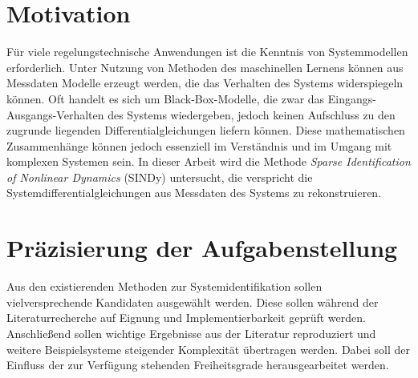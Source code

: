 \section{Motivation}
Für viele regelungstechnische Anwendungen ist die Kenntnis von Systemmodellen erforderlich. Unter Nutzung von Methoden des maschinellen Lernens können aus Messdaten Modelle erzeugt werden, die das Verhalten des Systems widerspiegeln können. Oft handelt es sich um Black-Box-Modelle, die zwar das Eingangs-Ausgangs-Verhalten des Systems wiedergeben, jedoch keinen Aufschluss zu den zugrunde liegenden Differentialgleichungen liefern können. Diese mathematischen Zusammenhänge können jedoch essenziell im Verständnis und im Umgang mit komplexen Systemen sein. In dieser Arbeit wird die Methode \textit{Sparse Identification of Nonlinear Dynamics} (SINDy) untersucht, die verspricht die Systemdifferentialgleichungen aus Messdaten des Systems zu rekonstruieren. 

\section{Präzisierung der Aufgabenstellung}
Aus den existierenden Methoden zur Systemidentifikation sollen vielversprechende Kandidaten ausgewählt werden. Diese sollen während der Literaturrecherche auf Eignung und Implementierbarkeit geprüft werden. 
Anschließend sollen wichtige Ergebnisse aus der Literatur reproduziert und weitere Beispielsysteme steigender Komplexität übertragen werden. 
Dabei soll der Einfluss der zur Verfügung stehenden Freiheitsgrade herausgearbeitet werden.
